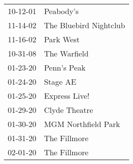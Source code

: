 \begin{supertabular}{p{0.25\columnwidth}p{0.75\columnwidth}}
 10-12-01 &               Peabody's \\
 11-14-02 &  The Bluebird Nightclub \\
 11-16-02 &               Park West \\
 10-31-08 &            The Warfield \\
 01-23-20 &             Penn's Peak \\
 01-24-20 &                Stage AE \\
 01-25-20 &           Express Live! \\
 01-29-20 &           Clyde Theatre \\
 01-30-20 &     MGM Northfield Park \\
 01-31-20 &            The Fillmore \\
 02-01-20 &            The Fillmore \\
\end{supertabular}
